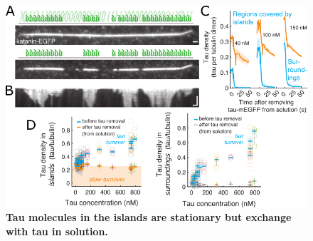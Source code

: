 \begin{figure}[h!]
\centering
\includegraphics[width=1\linewidth]{Figures/tau5.png}
\caption[Tau molecules in the islands are stationary but exchange with tau in solution.]{
\textbf{Tau molecules in the islands are stationary but exchange with tau in solution.} 
	}\label{tau5}
\end{figure}
